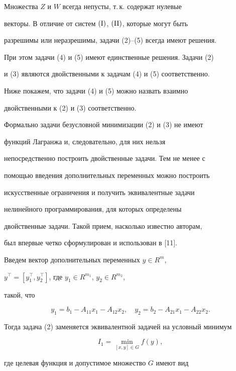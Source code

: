 Множества $Z$ и $W$ всегда непусты, т.\,к. содержат нулевые


векторы. В отличие от систем $(\mathrm I)$, $(\mathrm{II})$, которые могут быть


разрешимы или неразрешимы, задачи (2)--(5) всегда имеют решения.


При этом задачи (4) и (5) имеют единственные решения. Задачи (2)


и (3) являются двойственными к задачам (4) и (5) соответственно.


Ниже покажем, что задачи (4) и (5) можно назвать взаимно


двойственными к (2) и (3) соответственно.





Формально задачи безусловной минимизации (2) и (3) не имеют


функций Лагранжа и, следовательно, для них нельзя


непосредственно построить двойственные задачи. Тем не менее с


помощью введения дополнительных переменных можно построить


искусственные ограничения и получить эквивалентные задачи


нелинейного программирования, для которых определены


двойственные задачи. Такой прием, насколько известно авторам,


был впервые четко сформулирован и использован в [11].





Введем вектор дополнительных переменных $y\in R^m$, 


$y^\top=[y^\top_1,y^\top_2]$, где $y_1\in R^{m_1}$, $y_2\in R^{m_2}$,


такой, что


$$


y_1=b_1-A_{11}x_1-A_{12}x_2,\quad


y_2=b_2-A_{21}x_1-A_{22}x_2.


$$


Тогда задача (2) заменяется эквивалентной задачей на условный минимум


\begin{equation}


I_1=\min_{[x,y]\in G}f(y),


\end{equation}


где целевая функция и допустимое множество $G$ имеют вид


